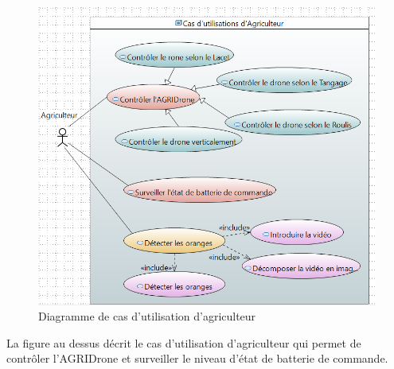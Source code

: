 		\begin{figure}[h] 
		\begin{center} 
			\centering
			\includegraphics[width=1\linewidth]{Images/Diagramme de cas d'utilisation agriculture}
		\end{center}
		
		\caption{Diagramme de cas d'utilisation d'agriculteur}
		\end{figure}
		La figure au dessus décrit le cas d’utilisation d'agriculteur qui permet de contrôler l’AGRIDrone et surveiller le niveau d'état de batterie de commande.
	
